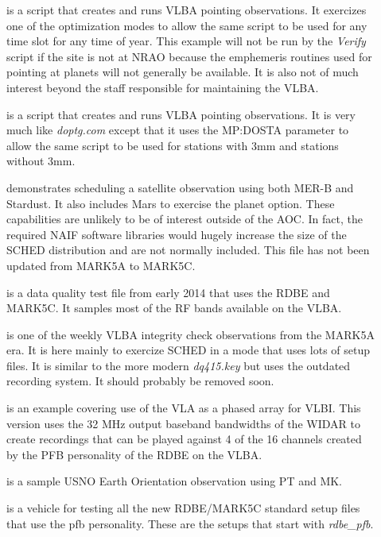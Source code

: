 \documentclass{report}
\begin{document}
\begin{description}
\item[] is a
script that creates and runs VLBA pointing observations.  It exercizes
one of the optimization modes to allow the same script to be used for
any time slot for any time of year.  This example will not be run by
the {\sl Verify} script if the site is not at NRAO because the
emphemeris routines used for pointing at planets will not generally be
available.  It is also not of much interest beyond the staff
responsible for maintaining the VLBA.

\item[] is a
script that creates and runs VLBA pointing observations.  It is very
much like {\sl doptg.com} except that it uses the 
{MP:DOSTA} parameter to allow the same script to be used for stations
with 3mm and stations without 3mm.

\item[]
demonstrates scheduling a satellite observation using both MER-B and
Stardust.  It also includes Mars to exercise the planet option.  These
capabilities are unlikely to be of interest outside of the AOC.  In
fact, the required NAIF software libraries would hugely increase the
size of the SCHED distribution and are not normally included.  This
file has not been updated from MARK5A to MARK5C.

\item[] is
a data quality test file from early 2014 that uses the RDBE and MARK5C.
It samples most of the RF bands available on the VLBA.

\item[] is one
of the weekly VLBA integrity check observations from the MARK5A era.
It is here mainly to exercize SCHED in a mode that uses lots of setup
files.  It is similar to the more modern {\sl dq415.key} but uses the
outdated recording system.  It should probably be removed soon.

\item[] is
an example covering use of the VLA as a phased array for VLBI.  This
version uses the 32 MHz output baseband bandwidths of the WIDAR to
create recordings that can be played against 4 of the 16 channels
created by the PFB personality of the RDBE on the VLBA.

\item[] is a
sample USNO Earth Orientation observation using PT and MK.

 is a
vehicle for testing all the new RDBE/MARK5C standard setup files that
use the pfb personality.  These are the setups that start with 
{\sl rdbe\_pfb}.


\end{description}
\end{document}
